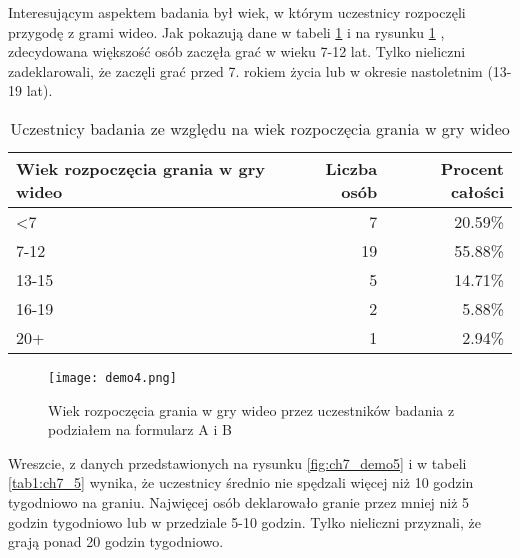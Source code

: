 \newpage

Interesującym aspektem badania był wiek, w którym uczestnicy rozpoczęli przygodę z grami wideo. Jak
pokazują dane w tabeli \ref{tab1:ch7_4}  i na rysunku \ref{fig:ch7_demo4} , zdecydowana większość osób
zaczęła grać w wieku 7-12 lat. Tylko nieliczni zadeklarowali, że zaczęli grać przed 7. rokiem życia
lub w okresie nastoletnim (13-19 lat).

\begin{table}[h!]
    \begin{center}
        \begin{tabular}{|l|r|r|}
            \hline
            Wiek rozpoczęcia grania w gry wideo & Liczba osób & Procent całości \\
            \hline
            <7                                  & 7           & 20.59\%         \\
            7-12                                & 19          & 55.88\%         \\
            13-15                               & 5           & 14.71\%         \\
            16-19                               & 2           & 5.88\%          \\
            20+                                 & 1           & 2.94\%          \\
            \hline
        \end{tabular}
    \end{center}
    \caption{Uczestnicy badania ze względu na wiek rozpoczęcia grania w gry wideo}\label{tab1:ch7_4}
\end{table}

\begin{figure}[h!]
    \centering
    \texttt{[image: demo4.png]}
    \caption{Wiek rozpoczęcia grania w gry wideo przez uczestników badania z podziałem na formularz A i B}
    \label{fig:ch7_demo4}
\end{figure}

\newpage

Wreszcie, z danych przedstawionych na rysunku \ref{fig:ch7_demo5} i w tabeli \ref{tab1:ch7_5} wynika, że uczestnicy średnio nie spędzali
więcej niż 10 godzin tygodniowo na graniu. Najwięcej osób deklarowało granie przez mniej niż 5 godzin
tygodniowo lub w przedziale 5-10 godzin. Tylko nieliczni przyznali, że grają ponad 20 godzin tygodniowo.

